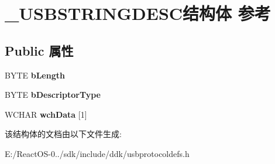 \hypertarget{struct___u_s_b_s_t_r_i_n_g_d_e_s_c}{}\section{\+\_\+\+U\+S\+B\+S\+T\+R\+I\+N\+G\+D\+E\+S\+C结构体 参考}
\label{struct___u_s_b_s_t_r_i_n_g_d_e_s_c}
\subsection*{Public 属性}
\begin{DoxyCompactItemize}
\item 
\mbox{\label{struct___u_s_b_s_t_r_i_n_g_d_e_s_c_aa44b17d6e64a1990812ec4255d95b6bd}} 
B\+Y\+TE {\bfseries b\+Length}
\item 
\mbox{\label{struct___u_s_b_s_t_r_i_n_g_d_e_s_c_a540ea7bfbafd1c4de252ac7c3d6eb68e}} 
B\+Y\+TE {\bfseries b\+Descriptor\+Type}
\item 
\mbox{\label{struct___u_s_b_s_t_r_i_n_g_d_e_s_c_aa46a0d234c0402aea7610bac43e70552}} 
W\+C\+H\+AR {\bfseries wch\+Data} \mbox{[}1\mbox{]}
\end{DoxyCompactItemize}


该结构体的文档由以下文件生成\+:\begin{DoxyCompactItemize}
\item 
E\+:/\+React\+O\+S-\/0../sdk/include/ddk/usbprotocoldefs.\+h\end{DoxyCompactItemize}
